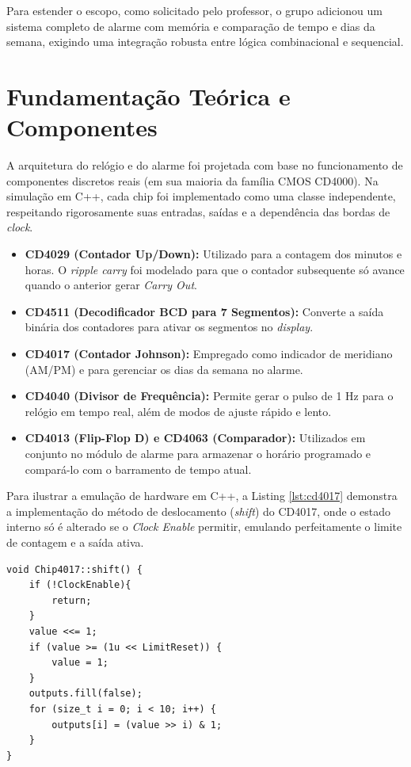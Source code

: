\documentclass[12pt]{article}
\begin{document}
Para estender o escopo, como solicitado pelo professor, o grupo adicionou um sistema completo de alarme com memória e comparação de tempo e dias da semana, exigindo uma integração robusta entre lógica combinacional e sequencial.

\section{Fundamentação Teórica e Componentes}

A arquitetura do relógio e do alarme foi projetada com base no funcionamento de componentes discretos reais (em sua maioria da família CMOS CD4000). Na simulação em C++, cada chip foi implementado como uma classe independente, respeitando rigorosamente suas entradas, saídas e a dependência das bordas de \textit{clock}.

\begin{itemize}
    \item \textbf{CD4029 (Contador Up/Down):} Utilizado para a contagem dos minutos e horas. O \textit{ripple carry} foi modelado para que o contador subsequente só avance quando o anterior gerar \textit{Carry Out}.
    \item \textbf{CD4511 (Decodificador BCD para 7 Segmentos):} Converte a saída binária dos contadores para ativar os segmentos no \textit{display}.
    \item \textbf{CD4017 (Contador Johnson):} Empregado como indicador de meridiano (AM/PM) e para gerenciar os dias da semana no alarme.
    \item \textbf{CD4040 (Divisor de Frequência):} Permite gerar o pulso de 1 Hz para o relógio em tempo real, além de modos de ajuste rápido e lento.
    \item \textbf{CD4013 (Flip-Flop D) e CD4063 (Comparador):} Utilizados em conjunto no módulo de alarme para armazenar o horário programado e compará-lo com o barramento de tempo atual.
\end{itemize}

Para ilustrar a emulação de hardware em C++, a Listing \ref{lst:cd4017} demonstra a implementação do método de deslocamento (\textit{shift}) do CD4017, onde o estado interno só é alterado se o \textit{Clock Enable} permitir, emulando perfeitamente o limite de contagem e a saída ativa.

\begin{lstlisting}[caption={Emulação do comportamento de deslocamento do CI CD4017 em C++.}, label={lst:cd4017}]
void Chip4017::shift() {
    if (!ClockEnable){
        return;
    }
    value <<= 1;
    if (value >= (1u << LimitReset)) {
        value = 1;
    }
    outputs.fill(false);
    for (size_t i = 0; i < 10; i++) {
        outputs[i] = (value >> i) & 1;
    }
}
\end{lstlisting}
\end{document}
